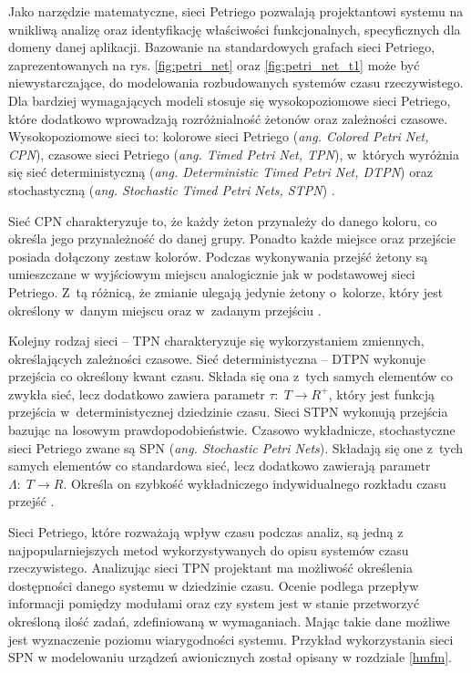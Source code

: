 \documentclass[a4paper, 12pt, twoside]{article}
\begin{document}
Jako narzędzie matematyczne, sieci Petriego pozwalają projektantowi systemu na wnikliwą analizę oraz identyfikację właściwości funkcjonalnych, specyficznych dla domeny danej aplikacji. Bazowanie na standardowych grafach sieci Petriego, zaprezentowanych na rys.  \ref{fig:petri_net} oraz  \ref{fig:petri_net_t1} może być niewystarczające, do modelowania rozbudowanych systemów czasu rzeczywistego. Dla bardziej wymagających modeli stosuje się wysokopoziomowe sieci Petriego, które dodatkowo wprowadzają rozróżnialność żetonów oraz zależności czasowe. Wysokopoziomowe sieci to: kolorowe sieci Petriego  (\textit{ang. Colored Petri Net, CPN}), czasowe sieci Petriego (\textit{ang. Timed Petri Net, TPN}), w~których wyróżnia się sieć deterministyczną (\textit{ang. Deterministic Timed Petri Net, DTPN}) oraz stochastyczną (\textit{ang. Stochastic Timed Petri Nets, STPN})  \cite{petriIntro}.

Sieć CPN charakteryzuje to, że każdy żeton przynależy do danego koloru, co określa jego przynależność do danej grupy. Ponadto każde miejsce oraz przejście posiada dołączony zestaw kolorów. Podczas wykonywania przejść żetony są umieszczane w wyjściowym miejscu analogicznie jak w podstawowej sieci Petriego. Z~tą różnicą, że zmianie ulegają jedynie żetony o~kolorze, który jest określony w~danym miejscu oraz w~zadanym przejściu \cite{petriIntro}.

Kolejny rodzaj sieci -- TPN charakteryzuje się wykorzystaniem zmiennych, określających zależności czasowe. Sieć deterministyczna -- DTPN wykonuje przejścia co określony kwant czasu. Składa się ona z~tych samych elementów co zwykła sieć, lecz dodatkowo zawiera parametr  \( \tau: \; T \rightarrow R^+\), który jest funkcją przejścia w~deterministycznej dziedzinie czasu. Sieci STPN wykonują przejścia bazując na losowym prawdopodobieństwie. Czasowo wykładnicze, stochastyczne sieci Petriego zwane są SPN (\textit{ang. Stochastic Petri Nets}). Składają się one z~tych samych elementów co standardowa sieć, lecz dodatkowo zawierają parametr \( \Lambda: \; T \rightarrow R\). Określa on szybkość wykładniczego indywidualnego rozkładu czasu przejść \cite{petriIntro}. 

Sieci Petriego, które rozważają wpływ czasu podczas analiz, są jedną z najpopularniejszych metod wykorzystywanych do opisu systemów czasu rzeczywistego. Analizując sieci TPN projektant ma możliwość określenia dostępności danego systemu w dziedzinie czasu. Ocenie podlega przepływ informacji pomiędzy modułami oraz czy system jest w stanie przetworzyć określoną ilość zadań, zdefiniowaną w wymaganiach. Mając takie dane możliwe jest wyznaczenie poziomu wiarygodności systemu. Przykład wykorzystania sieci SPN w modelowaniu urządzeń awionicznych został opisany w rozdziale \ref{hmfm}.
\end{document}
